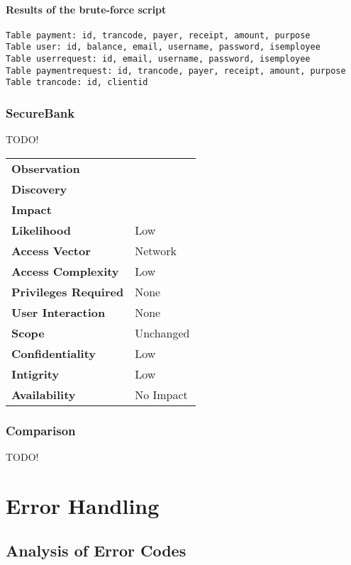 \paragraph{Results of the brute-force script}

\begin{verbatim}
Table payment: id, trancode, payer, receipt, amount, purpose
Table user: id, balance, email, username, password, isemployee
Table userrequest: id, email, username, password, isemployee
Table paymentrequest: id, trancode, payer, receipt, amount, purpose
Table trancode: id, clientid
\end{verbatim}

\subsubsection*{SecureBank}
TODO!
\begin{tabular}{l|p{10cm}}

\textbf{Observation} &  \\
\textbf{Discovery} &  \\
\textbf{Impact} & \\
\textbf{Likelihood} & Low \\
\textbf{Access Vector} & Network \\
\textbf{Access Complexity} & Low \\
\textbf{Privileges Required} & None \\
\textbf{User Interaction} & None \\
\textbf{Scope} & Unchanged \\
\textbf{Confidentiality} & Low \\
\textbf{Intigrity} & Low \\
\textbf{Availability} & No Impact \\
\end{tabular}

\subsubsection*{Comparison}
TODO!

\clearpage



\section{Error Handling}

\subsection{Analysis of Error Codes}
